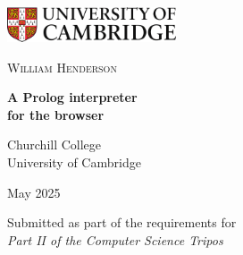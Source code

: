 \begin{titlepage}

\setlength{\baselineskip}{2em}

\centering

\begin{minipage}{0.5\textwidth}
  \includegraphics[width=5cm]{_cambridge.png}
\end{minipage}%
\begin{minipage}[t]{0.5\textwidth}
  \hfill \Large \scshape William Henderson
\end{minipage}

\vspace*{70mm}

{\Huge \bf A Prolog interpreter \\
for the browser}

\vspace*{10mm}

{\Large Churchill College \\
\Large University of Cambridge}

\vspace*{10mm}

{\Large May 2025}

\vspace*{70mm}

{\large Submitted as part of the requirements for} \\
{\large \it Part II of the Computer Science Tripos}

\end{titlepage}